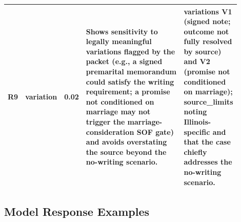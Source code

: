\begin{longtable}{p{0.07\linewidth}p{0.12\linewidth}p{0.08\linewidth}p{0.43\linewidth}p{0.20\linewidth}}
R9 & variation & 0.02 & Shows sensitivity to legally meaningful variations flagged by the packet (e.g., a signed premarital memorandum could satisfy the writing requirement; a promise not conditioned on marriage may not trigger the marriage-consideration SOF gate) and avoids overstating the source beyond the no-writing scenario. & variations V1 (signed note; outcome not fully resolved by source) and V2 (promise not conditioned on marriage); source\_limits noting Illinois-specific and that the case chiefly addresses the no-writing scenario. \\
\bottomrule
\end{longtable}

\subsection{Model Response Examples}

